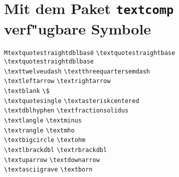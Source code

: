 
\appendix
\enlargethispage{1\baselineskip}

\section{Mit dem Paket \texttt{textcomp} verf"ugbare Symbole}
\label{textsymbols}

\iftcfonts %

\begingroup %
\renewcommand{\thefootnote}{\fnsymbol{footnote}} 

{\small
\begin{tabbing}
\quad\quad\=\texttt{Mtextquotestraightdblbase}\hspace{1cm}\=\quad\quad\=\kill
\textquotestraightbase \> \verb+\textquotestraightbase+\footnotemark[1]  \> \textquotestraightdblbase \> \verb+\textquotestraightdblbase+\footnotemark[1] \\
\texttwelveudash \> \verb+\texttwelveudash+\footnotemark[1]  \> \textthreequartersemdash \> \verb+\textthreequartersemdash+\footnotemark[1] \\
\textleftarrow \> \verb+\textleftarrow+ \> \textrightarrow \> \verb+\textrightarrow+\\
\textblank \> \verb+\textblank+ \> \textdollar \> \verb+\$+\footnotemark[1] \\
\textquotesingle \> \verb+\textquotesingle+\footnotemark[1]  \> \textasteriskcentered \> \verb+\textasteriskcentered+\footnotemark[1] \\
\textdblhyphen \> \verb+\textdblhyphen+ \> \textfractionsolidus \> \verb+\textfractionsolidus+\footnotemark[1] \\
\textlangle \> \verb+\textlangle+ \> \textminus \> \verb+\textminus+\footnotemark[1] \\
\textrangle \> \verb+\textrangle+ \> \textmho \> \verb+\textmho+\\
\textbigcircle \> \verb+\textbigcircle+ \> \textohm \> \verb+\textohm+\\
\textlbrackdbl \> \verb+\textlbrackdbl+ \> \textrbrackdbl \> \verb+\textrbrackdbl+\\
\textuparrow \> \verb+\textuparrow+ \> \textdownarrow \> \verb+\textdownarrow+\\
\textasciigrave \> \verb+\textasciigrave+\footnotemark[1]  \> \textborn \> \verb+\textborn+\\

\end{tabbing}}
